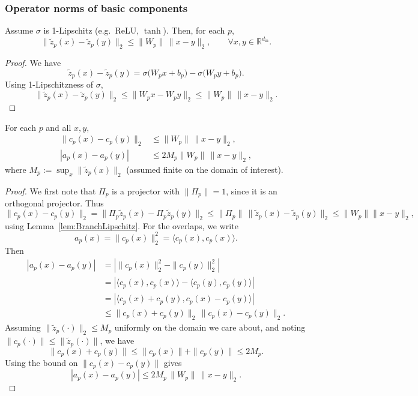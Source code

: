 \documentclass[11pt]{article}
\begin{document}
\subsubsection{Operator norms of basic components}

\begin{lemma}
\label{lem:BranchLipschitz}
Assume $\sigma$ is 1-Lipschitz (e.g.\ ReLU, $\tanh$). Then, for each $p$,
\[
\|\tilde{z}_p(x) - \tilde{z}_p(y)\|_2 \le \|W_p\|\,\|x-y\|_2,\qquad \forall x,y\in\mathbb{R}^{d_{\mathrm{in}}}.
\]
\end{lemma}

\begin{proof}
We have
\[
\tilde{z}_p(x) - \tilde{z}_p(y)
= \sigma\big(W_p x + b_p\big) - \sigma\big(W_p y + b_p\big).
\]
Using 1-Lipschitzness of $\sigma$,
\[
\|\tilde{z}_p(x) - \tilde{z}_p(y)\|_2
\le \|W_p x - W_p y\|_2
\le \|W_p\|\,\|x-y\|_2.
\]
\end{proof}

\begin{lemma}
\label{lem:FiberOverlapBounds}
For each $p$ and all $x,y$,
\begin{align*}
\|c_p(x) - c_p(y)\|_2 &\le \|W_p\|\,\|x-y\|_2,\\
|a_p(x) - a_p(y)| &\le 2 M_p \|W_p\| \,\|x-y\|_2,
\end{align*}
where $M_p := \sup_{x} \|\tilde{z}_p(x)\|_2$ (assumed finite on the domain of interest).
\end{lemma}

\begin{proof}
We first note that $\Pi_p$ is a projector with $\|\Pi_p\|=1$, since it is an orthogonal projector. Thus
\[
\|c_p(x) - c_p(y)\|_2 = \|\Pi_p \tilde{z}_p(x) - \Pi_p \tilde{z}_p(y)\|_2
\le \|\Pi_p\|\,\|\tilde{z}_p(x) - \tilde{z}_p(y)\|_2
\le \|W_p\|\|x-y\|_2,
\]
using Lemma~\ref{lem:BranchLipschitz}. For the overlaps, we write
\[
a_p(x) = \|c_p(x)\|_2^2 = \langle c_p(x), c_p(x)\rangle.
\]
Then
\begin{align*}
|a_p(x) - a_p(y)|
&= |\|c_p(x)\|_2^2 - \|c_p(y)\|_2^2|\\
&= |\langle c_p(x), c_p(x)\rangle - \langle c_p(y), c_p(y)\rangle|\\
&= |\langle c_p(x)+c_p(y), c_p(x)-c_p(y)\rangle|\\
&\le \|c_p(x)+c_p(y)\|_2 \,\|c_p(x)-c_p(y)\|_2.
\end{align*}
Assuming $\|\tilde{z}_p(\cdot)\|_2\le M_p$ uniformly on the domain we care about, and noting $\|c_p(\cdot)\|\le \|\tilde{z}_p(\cdot)\|$, we have
\[
\|c_p(x)+c_p(y)\|\le \|c_p(x)\| + \|c_p(y)\| \le 2M_p.
\]
Using the bound on $\|c_p(x)-c_p(y)\|$ gives
\[
|a_p(x)-a_p(y)| \le 2 M_p\,\|W_p\|\,\|x-y\|_2.
\]
\end{proof}
\end{document}
